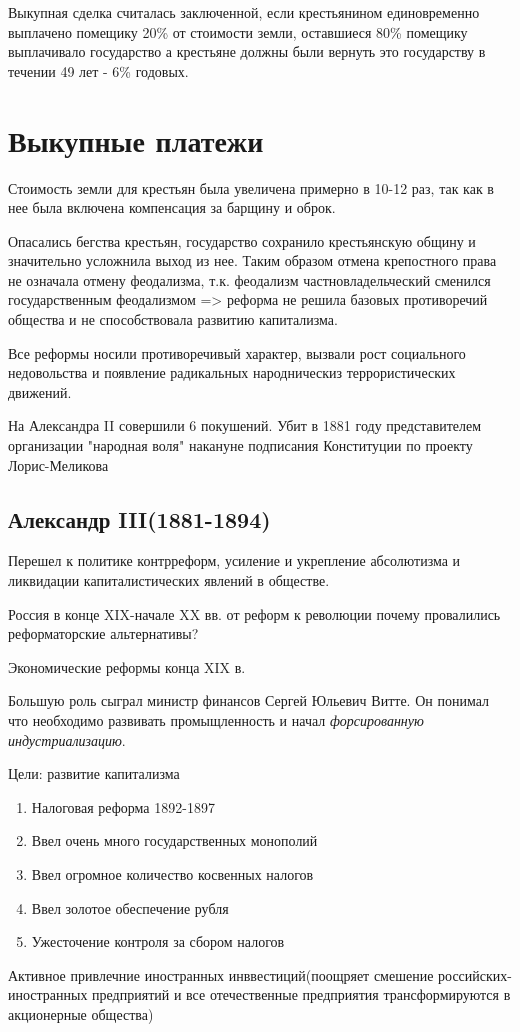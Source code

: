 \documentclass[a4paper]{article}
\begin{document}
Выкупная сделка считалась заключенной, если крестьянином единовременно выплачено помещику 20\% от стоимости земли, оставшиеся 80\% помещику выплачивало государство а крестьяне должны были вернуть это государству в течении 49 лет - 6\% годовых.

\section{Выкупные платежи}
Стоимость земли для крестьян была увеличена примерно в 10-12 раз, так как в нее была включена компенсация за барщину и оброк.

Опасались бегства крестьян, государство сохранило крестьянскую общину и значительно усложнила выход из нее. Таким образом отмена крепостного права не означала отмену феодализма, т.к. феодализм частновладельческий сменился государственным феодализмом => реформа не решила базовых противоречий общества и не способствовала развитию капитализма.

Все реформы носили противоречивый характер, вызвали рост социального недовольства и появление радикальных народническиз террористических движений.

На Александра II совершили 6 покушений. Убит в 1881 году представителем организации "народная воля" накануне подписания Конституции по проекту Лорис-Меликова

\subsection{Александр III(1881-1894)}
Перешел к политике контрреформ, усиление и укрепление абсолютизма и ликвидации капиталистических явлений в обществе.

Россия в конце XIX-начале XX вв. от реформ к революции почему провалились реформаторские альтернативы?

Экономические реформы конца XIX в.

Большую роль сыграл министр финансов Сергей Юльевич Витте. Он понимал что необходимо развивать промыщленность и начал \emph{форсированную индустриализацию}.

Цели: развитие капитализма
\begin{enumerate}
    \item Налоговая реформа 1892-1897
    \item Ввел очень много государственных монополий
    \item Ввел огромное количество косвенных налогов
    \item Ввел золотое обеспечение рубля
    \item Ужесточение контроля за сбором налогов
\end{enumerate}
Активное привлечние иностранных инввестиций(поощряет смешение российских-иностранных предприятий и все отечественные предприятия трансформируются в акционерные общества)
\end{document}
